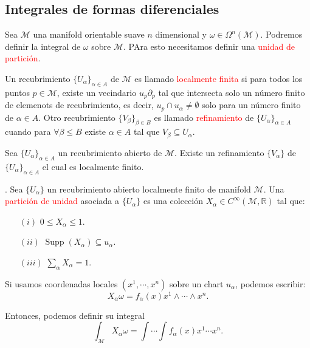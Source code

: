 \documentclass[../main]{subfiles}
\begin{document}
\subsection{Integrales de formas diferenciales}
Sea $\mathcal{M}$ una manifold orientable suave $n$ dimensional y $\omega \in \Omega^n(\mathcal{M})$. Podremos definir la integral de $\omega$ sobre $\mathcal{M}$. PAra esto necesitamos definir una \textcolor{red}{unidad de partición}.

 Un recubrimiento $\{U_{\alpha}\}_{\alpha \in A}$ de $\mathcal{M}$ es llamado \textcolor{red}{localmente finita} si para todos los puntos $p \in \mathcal{M}$, existe un vecindario $u_p \partial_p$ tal que intersecta solo un número finito de elemenots de recubrimiento, es decir, $u_p \cap u_{\alpha} \neq \emptyset$ solo para un número finito de $\alpha \in A$. Otro recubrimiento $\{V_{\beta}\}_{\beta \in B}$ es llamado \textcolor{red}{refinamiento} de $\{ U_{\alpha}\}_{\alpha \in A}$ cuando para $\forall \beta \leq B$ existe $\alpha \in A$ tal que $V_{\beta} \subseteq U_{\alpha}$.

\teorema{} Sea $\{ U_{\alpha}\}_{\alpha \in A}$ un recubrimiento abierto de $\mathcal{M}$. Existe un refinamiento $\{V_{\alpha}\}$ de $\{U_{\alpha}\}_{\alpha \in A}$ el cual es localmente finito.

. Sea $\{U_{\alpha}\}$ un recubrimiento abierto localmente finito de manifold $\mathcal{M}$. Una \textcolor{red}{partición de unidad} asociada a $\{U_{\alpha}\}$ es una colección $X_{\alpha} \in C^{\infty}(\mathcal{M}, \mathbb{R})$ tal que: 
\begin{enumerate}
\addtolength{\itemindent}{6cm}
    \item[$(i)$] $0\leq X_{\alpha} \leq 1$.
    \item[$(ii)$] $\operatorname{Supp}(X_{\alpha})\subseteq u_{\alpha}$.
    \item[$(iii)$] $\sum_{\alpha} X_{\alpha}=1$. 
\end{enumerate}
Si usamos coordenadas locales $(x^1, \cdots, x^n)$ sobre un chart $u_{\alpha}$, podemos escribir:
\begin{equation}
    X_{\alpha}\omega=f_{\alpha}(x)x^1\wedge \cdots \wedge x^n.
\end{equation}

Entonces, podemos definir su integral
\begin{equation}
    \int_{\mathcal{M}} X_{\alpha} \omega=\int \cdots \int f_{\alpha}(x) x^1 \cdots x^n.
\end{equation}
\end{document}
